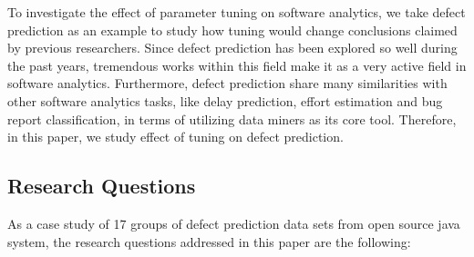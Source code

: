 

To investigate the effect of parameter tuning on software analytics, 
we take defect prediction as an example to study how tuning
would change conclusions claimed by previous researchers. 
Since defect prediction has been explored so well during
the past years, tremendous works within this field make it as a very 
active field in software analytics. Furthermore, defect prediction
share many similarities with other software analytics tasks, 
like delay prediction, effort estimation and bug report classification,
in terms of utilizing data miners as its core tool. 
Therefore, in this paper, we study effect of tuning on defect prediction.

\subsection{Research Questions}
As a case study of 17 groups of defect prediction data sets from open source java system,  the research questions addressed in this paper are the following:

